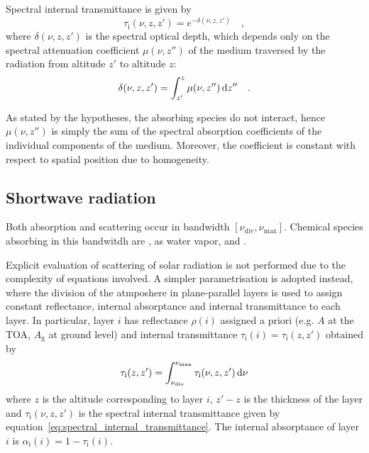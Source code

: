 \documentclass[a4paper,10pt,twocolumn,\classoptions]{article}
\begin{document}
Spectral internal transmittance is given by
\begin{equation}
  \label{eq:spectral_internal_transmittance}
  \tau_\text{i}(\nu, z, z') = e^{-\delta(\nu, z, z')}
  \quad ,
\end{equation}
where $\delta(\nu, z, z')$ is the spectral optical depth, which depends only on the spectral attenuation coefficient $\mu(\nu, z'')$ of the medium traversed by the radiation from altitude $z'$ to altitude $z$:
\begin{equation}
  \label{eq:spectral_optical_thickness}
  \delta(\nu, z, z') = \int_{z'}^{z} \mu(\nu, z'') \odif{z''}
  \quad .
\end{equation}

As stated by the hypotheses, the absorbing species do not interact, hence $\mu(\nu, z'')$ is simply the sum of the spectral absorption coefficients of the individual components of the medium. Moreover, the coefficient is constant with respect to spatial position due to homogeneity.




\subsection{Shortwave radiation}
\label{sec:Shortwave radiation}
Both absorption and scattering occur in bandwidth $[\nu_\text{div}, \nu_\text{max}]$.
Chemical species absorbing in this bandwitdh are ,  as water vapor,  and .

Explicit evaluation of scattering of solar radiation is not performed due to the complexity of equations involved. A simpler parametrisation is adopted instead, where the division of the atmposhere in plane-parallel layers is used to assign constant reflectance, internal absorptance and internal transmittance to each layer.
In particular, layer $i$ has reflectance $\rho(i)$ assigned a priori (e.g. $A$ at the TOA, $A_\text{g}$ at ground level) and internal transmittance $\tau_\text{i}(i) = \tau_\text{i}(z, z')$ obtained by
\begin{equation}
  \label{eq:internal_transmittance}
  \tau_\text{i}(z, z') = \int_{\nu_\text{div}}^{\nu_\text{max}} \tau_\text{i}(\nu, z, z') \odif{\nu}
\end{equation}
where $z$ is the altitude corresponding to layer $i$, $z' - z$ is the thickness of the layer and $\tau_\text{i}(\nu, z, z')$ is the spectral internal transmittance given by equation~\eqref{eq:spectral_internal_transmittance}. The internal absorptance of layer $i$ is $\alpha_\text{i}(i) = 1 - \tau_\text{i}(i)$.
\end{document}
